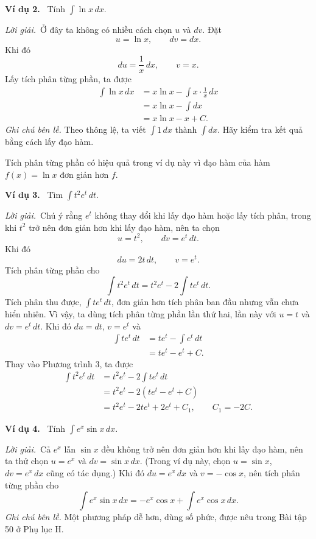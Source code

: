\documentclass[12pt,a4paper]{article}
\newcommand{\ex}[1]{\par\medskip\noindent\textbf{Ví dụ #1.}\ }
\newcommand{\sol}{\par\nopagebreak[4]\noindent\textit{Lời giải.}\ }
\begin{document}
\ex{2} Tính $\displaystyle\int\ln x\,dx$.
\sol Ở đây ta không có nhiều cách chọn $u$ và $dv$. Đặt
\[u=\ln x,\qquad dv=dx.\]
Khi đó
\[du=\frac1x\,dx,\qquad v=x.\]
Lấy tích phân từng phần, ta được
\begin{align*}
\int\ln x\,dx&=x\ln x-\int x\cdot\frac1x\,dx\\
&=x\ln x-\int dx\\
&=x\ln x-x+C.
\end{align*}
\textit{Ghi chú bên lề.} Theo thông lệ, ta viết $\int1\,dx$ thành $\int dx$. Hãy kiểm tra kết quả bằng cách lấy đạo hàm.

Tích phân từng phần có hiệu quả trong ví dụ này vì đạo hàm của hàm $f(x)=\ln x$ đơn giản hơn $f$.

\ex{3} Tìm $\displaystyle\int t^2e^t\,dt$.
\sol Chú ý rằng $e^t$ không thay đổi khi lấy đạo hàm hoặc lấy tích phân, trong khi $t^2$ trở nên đơn giản hơn khi lấy đạo hàm, nên ta chọn
\[u=t^2,\qquad dv=e^t\,dt.\]
Khi đó
\[du=2t\,dt,\qquad v=e^t.\]
Tích phân từng phần cho
\begin{equation}\int t^2e^t\,dt=t^2e^t-2\int te^t\,dt.\tag{3}\end{equation}
Tích phân thu được, $\int te^t\,dt$, đơn giản hơn tích phân ban đầu nhưng vẫn chưa hiển nhiên. Vì vậy, ta dùng tích phân từng phần lần thứ hai, lần này với $u=t$ và $dv=e^t\,dt$. Khi đó $du=dt$, $v=e^t$ và
\begin{align*}
\int te^t\,dt&=te^t-\int e^t\,dt\\
&=te^t-e^t+C.
\end{align*}
Thay vào Phương trình 3, ta được
\begin{align*}
\int t^2e^t\,dt&=t^2e^t-2\int te^t\,dt\\
&=t^2e^t-2(te^t-e^t+C)\\
&=t^2e^t-2te^t+2e^t+C_1,\qquad C_1=-2C.
\end{align*}

\ex{4} Tính $\displaystyle\int e^x\sin x\,dx$.
\sol Cả $e^x$ lẫn $\sin x$ đều không trở nên đơn giản hơn khi lấy đạo hàm, nên ta thử chọn $u=e^x$ và $dv=\sin x\,dx$. (Trong ví dụ này, chọn $u=\sin x$, $dv=e^x\,dx$ cũng có tác dụng.) Khi đó $du=e^x\,dx$ và $v=-\cos x$, nên tích phân từng phần cho
\begin{equation}\int e^x\sin x\,dx=-e^x\cos x+\int e^x\cos x\,dx.\tag{4}\end{equation}
\textit{Ghi chú bên lề.} Một phương pháp dễ hơn, dùng số phức, được nêu trong Bài tập 50 ở Phụ lục H.
\end{document}
